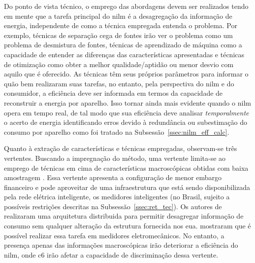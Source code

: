 Do ponto de vista técnico, o emprego das abordagens devem ser
realizados tendo em mente que a tarefa principal do \gls{nilm}
é a desagregação da informação de energia, independente de como a
técnica empregada entenda o problema. Por exemplo, técnicas de separação
cega de fontes irão ver o problema como um problema de desmistura de
fontes, técnicas de aprendizado de máquina como a capacidade de
entender as diferenças das características apresentadas e técnicas de
otimização como obter a melhor qualidade/aptidão ou menor desvio com
aquilo que é oferecido.  As técnicas têm seus próprios parâmetros para
informar o quão bem realizaram suas tarefas, no entanto, pela
perspectiva do \gls{nilm} e do consumidor, a eficiência deve ser
informada em termos da capacidade de reconstruir a energia por
aparelho. Isso tornar ainda mais evidente quando o \gls{nilm} opera
em tempo real, de tal modo que sua eficiência deve analisar
\emph{temporalmente} o acerto de energia identificando erros devido à
redundância ou subestimação do consumo por aparelho como foi tratado
na Subsessão~\ref{ssec:nilm_eff_calc}.

Quanto à extração de características e técnicas empregadas, observam-se
três vertentes. Buscando a impregnação do método, uma vertente
limita-se ao emprego de técnicas em cima de características
macroscópicas obtidas com baixa amostragem 
\cite{nilm_hart_1992_8,nilm_cole_data_extraction_1998_14,
nilm_cole_extra_info_surge_1998_15,
nilm_norford_leeb_medianfilt_1996_13,
nilm_leeb_spectral_envelope_1995_23,
nilm_powers_15minsamp_1991_16,
nilm_farinaccio_16ssamp_1999_17,
nilm_marceau_16ssamp_improved_1999_18,
nilm_baranski_genetic_base_2003_19,
nilm_baranski_genetic_detalhado_2004_20,nilm_baranski_summary_2004_21,
nilm_bergman_distribuido_2011,nilm_genetic_2013,nilm_zeifman_vast_2011,
nilm_zeifman_vastext_approach_2012,
nilm_zeifman_statistical_vastext_1stws_2012,
nilm_zeifman_statistical_naive_enduses_2013}. Essa vertente apresenta
a configuração de menor embargo financeiro e pode aproveitar de uma
infraestrutura que está sendo disponibilizada pela rede elétrica
inteligente, os medidores inteligentes (no Brasil, sujeito a possíveis
restrições descritas na Subsessão~\ref{ssec:ret_tec}).  Os autores de
\cite{nilm_bergman_distribuido_2011} realizaram uma arquitetura
distribuida para permitir desagregar informação de consumo sem
qualquer alteração da estrutura fornecida nos \gls{eua}.
\cite{nilm_baranski_genetic_base_2003_19,
nilm_baranski_genetic_detalhado_2004_20,nilm_baranski_summary_2004_21}
mostraram que é possível realizar essa tarefa em medidores
eletromecânicos. No entanto, a presença apenas das informações
macroscópicas irão deteriorar a eficiência do \gls{nilm}, onde
\gls{c6} irão afetar a capacidade de discriminação dessa vertente. 

